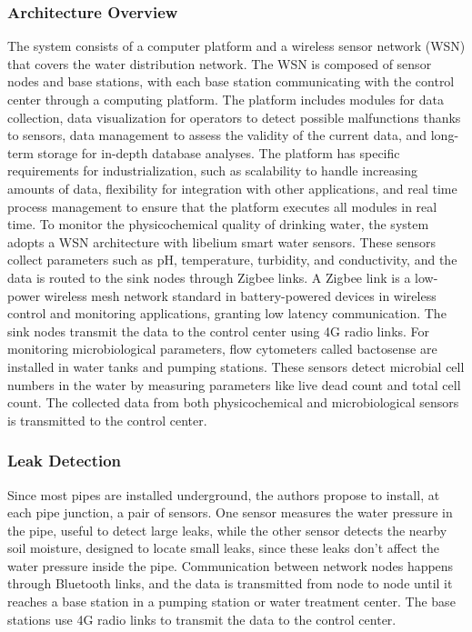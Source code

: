 \documentclass[draft, {\secondLanguage}, english]{volcanica-template}
\begin{document}
\subsubsection{Architecture Overview}
The system consists of a computer platform and a wireless sensor network (WSN) that covers the water distribution network. The WSN is composed of sensor nodes and base stations, with each base station communicating with the control center through a computing platform. The platform includes modules for data collection, data visualization for operators to detect possible malfunctions thanks to sensors, data management to assess the validity of the current data, and long-term storage for in-depth database analyses.
The platform has specific requirements for industrialization, such as scalability to handle increasing amounts of data, flexibility for integration with other applications, and real time process management to ensure that the platform executes all modules in real time. To monitor the physicochemical quality of drinking water, the system adopts a WSN architecture with libelium smart water sensors. These sensors collect parameters such as pH, temperature, turbidity, and conductivity, and the data is routed to the sink nodes through Zigbee links. A Zigbee link is a low-power wireless mesh network standard in battery-powered devices in wireless control and monitoring applications, granting low latency communication. The sink nodes transmit the data to the control center using 4G radio links. For monitoring microbiological parameters, flow cytometers called bactosense are installed in water tanks and pumping stations. These sensors detect microbial cell numbers in the water by measuring parameters like live dead count and total cell count. The collected data from both physicochemical and microbiological sensors is transmitted to the control center.
\subsubsection{Leak Detection}
Since most pipes are installed underground, the authors propose to install, at each pipe junction, a pair of sensors. One sensor measures the water pressure in the pipe, useful to detect large leaks, while the other sensor detects the nearby soil moisture, designed to locate small leaks, since these leaks don't affect the water pressure inside the pipe. Communication between network nodes happens through Bluetooth links, and the data is transmitted from node to node until it reaches a base station in a pumping station or water treatment center. The base stations use 4G radio links to transmit the data to the control center.
\end{document}
